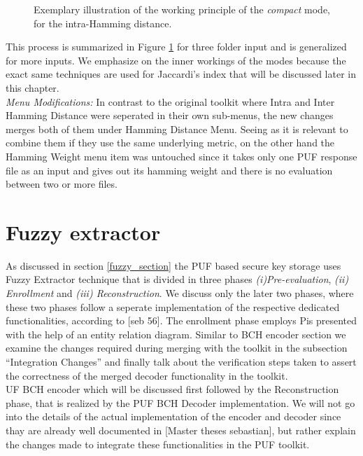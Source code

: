 \begin{figure}
\centering
{}
\caption{Exemplary illustration of the working principle of the \emph{compact} mode, for the intra-Hamming distance.}
\label{img:inter_compact}
\end{figure}

This process is summarized in Figure \ref{img:inter_compact} for three folder input and is generalized for more inputs. We emphasize on the inner workings of the modes because the exact same techniques are used for Jaccardi's index that will be discussed later in this chapter.\\

\emph{Menu Modifications:} In contrast to the original toolkit where Intra and Inter Hamming Distance were seperated in their own sub-menus, the new changes merges both of them under Hamming Distance Menu. Seeing as it is relevant to combine them if they use the same underlying metric, on the other hand the Hamming Weight menu item was untouched since it takes only one PUF response file as an input and gives out its hamming weight and there is no evaluation between two or
more files.\\


\section{Fuzzy extractor}
As discussed in section \ref{fuzzy_section} the PUF based secure key storage uses Fuzzy Extractor technique that is divided in three phases \emph{(i)Pre-evaluation}, \emph{(ii) Enrollment} and \emph{(iii) Reconstruction}. We discuss only the later two phases, where these two phases follow a seperate implementation of the respective dedicated functionalities, according to [seb 56]. The enrollment phase employs Pis presented with the help of an entity relation diagram. Similar to BCH encoder
section we examine the changes required during merging with the toolkit in the subsection ``Integration Changes'' and finally talk about the verification steps taken to assert the correctness of the merged decoder functionality in the toolkit.\\UF BCH encoder which will be discussed first followed by the Reconstruction phase, that is
realized by the PUF BCH Decoder implementation. We will not go into the details of the actual implementation of the encoder and decoder since thay are already well documented in [Master theses sebastian], but rather explain the changes made to integrate these functionalities in the PUF toolkit.\\


